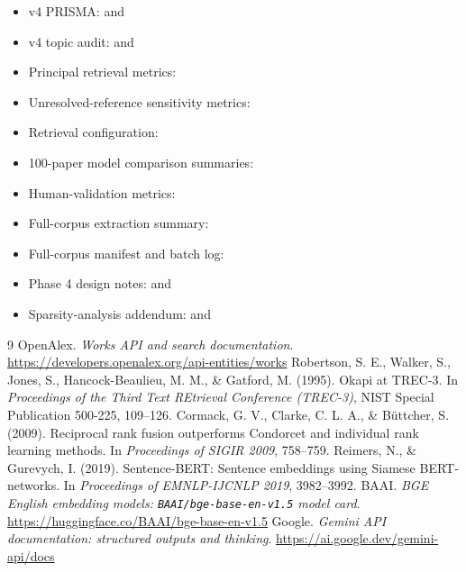 \documentclass[sigconf,review,anonymous]{acmart}
\begin{document}
\begin{itemize}
\item v4 PRISMA: \texttt{} and \texttt{}
\item v4 topic audit: \texttt{} and \texttt{}
\item Principal retrieval metrics: \texttt{}
\item Unresolved-reference sensitivity metrics: \texttt{}
\item Retrieval configuration: \texttt{}
\item 100-paper model comparison summaries: \texttt{}
\item Human-validation metrics: \texttt{}
\item Full-corpus extraction summary: \texttt{}
\item Full-corpus manifest and batch log: \texttt{}
\item Phase 4 design notes: \texttt{} and \texttt{}
\item Sparsity-analysis addendum: \texttt{} and \texttt{}
\end{itemize}
\begin{thebibliography}{9}
 OpenAlex. \emph{Works API and search documentation}. \url{https://developers.openalex.org/api-entities/works}
 Robertson, S. E., Walker, S., Jones, S., Hancock-Beaulieu, M. M., \& Gatford, M. (1995). Okapi at TREC-3. In \emph{Proceedings of the Third Text REtrieval Conference (TREC-3)}, NIST Special Publication 500-225, 109--126.
 Cormack, G. V., Clarke, C. L. A., \& B\"uttcher, S. (2009). Reciprocal rank fusion outperforms Condorcet and individual rank learning methods. In \emph{Proceedings of SIGIR 2009}, 758--759.
 Reimers, N., \& Gurevych, I. (2019). Sentence-BERT: Sentence embeddings using Siamese BERT-networks. In \emph{Proceedings of EMNLP-IJCNLP 2019}, 3982--3992.
 BAAI. \emph{BGE English embedding models: \texttt{BAAI/bge-base-en-v1.5} model card}. \url{https://huggingface.co/BAAI/bge-base-en-v1.5}
 Google. \emph{Gemini API documentation: structured outputs and thinking}. \url{https://ai.google.dev/gemini-api/docs}
\end{thebibliography}
\end{document}
